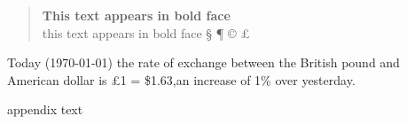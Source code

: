 \documentclass[12pt,twoside,a4paper]{article}   %
\begin{document}
	\begin{quote}
		{\bfseries This text appears in bold face}\\
		\setlength{\parindent}{0.5cm} this text appears in bold face
		\setlength{\textwidth}{12.5cm}
			\S 
			\ddag 
			\P
			\copyright 
			\pounds			
	\end{quote}
	Today (\today) the rate of exchange between the British pound and American dollar is \pounds 1 = \$1.63,an increase of 1\% over yesterday.

	\setlength{\parskip}{1.5ex} %
	\setlength{\parindent}{0em} %
	\renewcommand{\baselinestretch}{2} %
	\setlength{\textwidth}{12.5cm} %
	\begin{appendix}
		appendix text
	\end{appendix}
\end{document}
